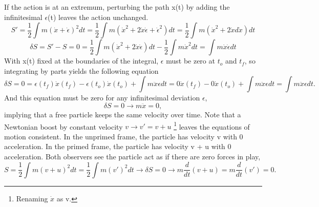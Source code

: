 \documentclass[12pt]{article}
\begin{document}
If the action is at an extremum, perturbing the path x(t) by adding the infinitesimal $\epsilon$(t) leaves the action unchanged.
\begin{equation}
S' = \frac{1}{2} \int m(\dot{x} + \dot{\epsilon})^2 dt = \frac{1}{2} \int m(\dot{x}^2 + 2\dot{x}\dot{\epsilon} + \dot{\epsilon}^2) dt =  
\frac{1}{2} \int m(\dot{x}^2 + 2\dot{x}d\dot{x}) dt 
\end{equation}
\begin{equation}
\delta S = S' - S = 0 = \frac{1}{2} \int m(\dot{x}^2 + 2\dot{x}\dot{\epsilon}) dt - \frac{1}{2} \int m\dot{x}^2 dt = \int m\dot{x}\dot{\epsilon} dt
\end{equation}
With x(t) fixed at the boundaries of the integral, $\epsilon$ must be zero at $t_o$ and $t_f$, so integrating by parts yields the following equation 
\begin{equation}
\delta S = 0 = \epsilon(t_f) \dot{x}(t_f)  - \epsilon(t_o) \dot{x}(t_o) + \int m\ddot{x} \epsilon dt  = 
0\dot{x}(t_f)  - 0\dot{x}(t_o) + \int m\ddot{x} \epsilon dt = \int m\ddot{x} \epsilon dt.
\end{equation}
And this equation must be zero for any infinitesimal deviation $\epsilon$,
\begin{equation}
\delta S = 0 \rightarrow m\ddot{x} = 0,
\end{equation}
implying that a free particle keeps the same velocity over time. Note that a Newtonian boost by constant velocity $v \rightarrow v' = v + u$ \footnote{Renaming $\dot{x}$ as v.} leaves the equations of motion consistent. In the unprimed frame, the particle has velocity v with 0 acceleration. In the primed frame, the particle has velocity v + u with 0 acceleration. Both observers see the particle act as if there are zero forces in play,
\begin{equation}
S = \frac{1}{2} \int m(v + u)^2 dt  =  \frac{1}{2} \int m(v')^2 dt \rightarrow \delta S = 0 \rightarrow m\frac{d}{dt}(v+u) = m\frac{d}{dt}(v') = 0.
\end{equation}
\end{document}

